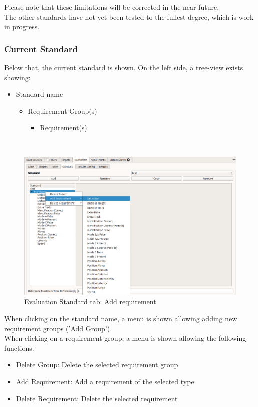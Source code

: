 Please note that these limitations will be corrected in the near future. \\ 

The other standards have not yet been tested to the fullest degree, which is work in progress.


\subsubsection{Current Standard}

Below that, the current standard is shown. On the left side, a tree-view exists showing:
\begin{itemize}  
\item Standard name
\begin{itemize}  
\item Requirement Group(s)
\begin{itemize}  
\item Requirement(s)
\end{itemize}
\end{itemize}
\end{itemize}
\ \\

\begin{figure}[H]
  \hspace*{-2cm}
    \includegraphics[width=18cm,frame]{figures/eval_standard_add_req.png}
  \caption{Evaluation Standard tab: Add requirement}
\end{figure}

When clicking on the standard name, a menu is shown allowing adding new requirement groups ('Add Group'). \\

When clicking on a requirement group, a menu is shown allowing the following functions:
\begin{itemize}  
\item Delete Group: Delete the selected requirement group
\item Add Requirement: Add a requirement of the selected type
\item Delete Requirement: Delete the selected requirement
\end{itemize}
\ \\

